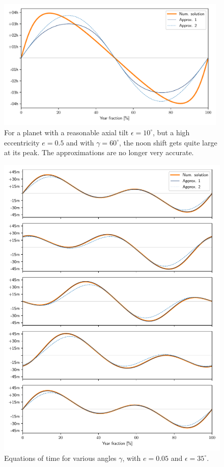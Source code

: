 \documentclass[12pt]{article}
\begin{document}
\begin{figure}[ht]
    \centering
    \includegraphics[width=0.98\textwidth]{./figures/noon_computed_extreme.pdf}
    \caption{
        For a planet with a reasonable axial tilt $\epsilon=10^\circ$,
        but a high eccentricity $e=0.5$ and with $\gamma=60^\circ$, 
        the noon shift gets quite large at its peak. The approximations
        are no longer very accurate.
    }
    \label{fig:noon_computed_extreme}
\end{figure}

\begin{figure}
    \centering
    \includegraphics[width=\textwidth]{./figures/noon_low_e.pdf}
    \caption{Equations of time for various angles $\gamma$, with 
        $e=0.05$ and $\epsilon=35^\circ$.
    }
    \label{fig:noon_low_e}
\end{figure}

\clearpage
\nocite{*}
\printbibliography
% 
% 
\end{document}
